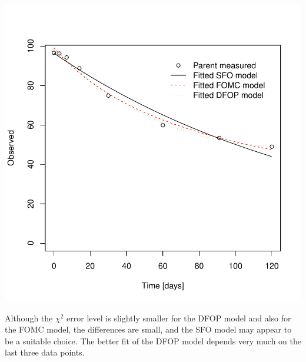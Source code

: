 \documentclass[12pt,a4paper]{article}
\begin{document}
\includegraphics{examples-FOCUS_2006_L4}

Although the $\chi^2$ error level is slightly smaller for the DFOP model and also
for the FOMC model, the differences are small, and the SFO model may appear to
be a suitable choice. The better fit of the DFOP model depends very much on the
last three data points.



\end{document}
